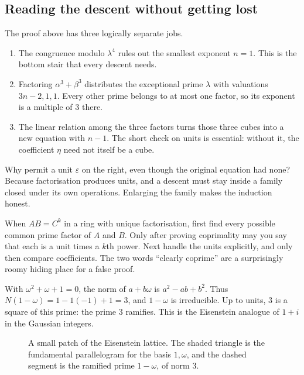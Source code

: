 \subsection*{Reading the descent without getting lost}
The proof above has three logically separate jobs.
\begin{enumerate}
\item The congruence modulo $\lambda^4$ rules out the smallest exponent $n=1$.
This is the bottom stair that every descent needs.
\item Factoring $\alpha^3+\beta^3$ distributes the exceptional prime $\lambda$
with valuations $3n-2,1,1$. Every other prime belongs to at most one factor,
so its exponent is a multiple of $3$ there.
\item The linear relation among the three factors turns those three cubes into
a new equation with $n-1$. The short check on units is essential: without it,
the coefficient $\eta$ need not itself be a cube.
\end{enumerate}
Why permit a unit $\varepsilon$ on the right, even though the original equation
had none? Because factorisation produces units, and a descent must stay inside
a family closed under its own operations. Enlarging the family makes the
induction honest.

\begin{reminder}
When $AB=C^k$ in a ring with unique factorisation, first find every possible
common prime factor of $A$ and $B$. Only after proving coprimality may you say
that each is a unit times a $k$th power. Next handle the units explicitly, and
only then compare coefficients. The two words ``clearly coprime'' are a
surprisingly roomy hiding place for a false proof.
\end{reminder}

\begin{examplex}
With $\omega^2+\omega+1=0$, the norm of $a+b\omega$ is $a^2-ab+b^2$. Thus $N(1-\omega)=1-1(-1)+1=3$, and $1-\omega$ is irreducible. Up to units, $3$ is a square of this prime: the prime $3$ ramifies. This is the Eisenstein analogue of $1+i$ in the Gaussian integers.
\end{examplex}

\begin{figure}[ht]
\centering
{}
\caption{A small patch of the Eisenstein lattice. The shaded triangle is the fundamental parallelogram for the basis $1,\omega$, and the dashed segment is the ramified prime $1-\omega$, of norm $3$.}
\label{fig:t1-eisenstein}
\end{figure}

